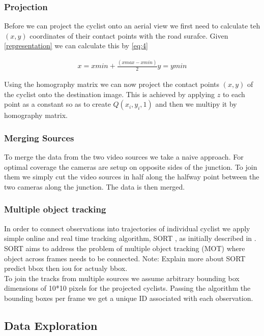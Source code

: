 \subsubsection{Projection}

Before we can project the cyclist onto an aerial view we first need to calculate teh $(x, y)$ coordinates of their contact points with the road surafce.
Given \ref{representation} we can calculate this by \ref{eq:4}

\begin{align}
  x = xmin + \frac{(xmax - xmin)}{2} 
  y = ymin\label{eq:4}
\end{align} 

Using the homography matrix we can now project the contact points $(x, y)$ of the cyclist onto the destination
image. This is achieved by applying $z$ to each point as a constant so as to create $Q(x_i, y_i, 1)$ and then we multipy it by 
homography matrix. 

\subsubsection{Merging Sources}

To merge the data from the two video sources we take a naive approach. For optimal coverage the cameras are setup on
opposite sides of the junction. To join them we simply cut the video sources in half along the halfway point between
the two cameras along the junction. The data is then merged.

\subsubsection{Multiple object tracking}

In order to connect observations into trajectories of individual cyclist we apply 
simple online and real time tracking algorithm, SORT \cite{abewley_abewley/sort_2021}, as initially described in \cite{Bewley2016_sort}. 
SORT aims to address the problem of multiple object tracking (MOT) where object across frames needs to be connected. 
Note: Explain more about SORT predict bbox then iou for actualy bbox.
\ \\
To join the tracks from multiple sources we assume arbitrary bounding box dimensions of 10*10 pixels for the projected cyclists. 
Passing the algorithm the bounding boxes per frame we get a unique ID associated with each observation.

\subsection{Data Exploration}

